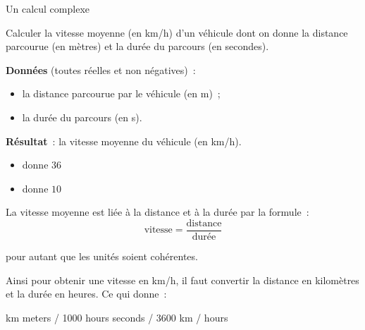\begin{Fiche}{Un calcul complexe}
\label{fiche:calcul-complexe}


	Calculer la vitesse moyenne (en km/h) d’un véhicule dont on donne la
	distance parcourue (en mètres) et la durée du parcours (en secondes). 

	
	\textbf{Données} (toutes réelles et non négatives)~:
		\begin{itemize}
		\item la distance parcourue par le véhicule (en m)~;
		\item la durée du parcours (en s).
		\end{itemize}
		
	\textbf{Résultat}~: la vitesse moyenne du véhicule (en km/h).

	\begin{center}
	\end{center}


	\begin{itemize}
	\item {} donne $36$
	\item {} donne $10$
	\end{itemize}


	La vitesse moyenne est liée à la distance et à la durée par la formule~:
	\[
		\textrm{vitesse} = \frac{\textrm{distance}}{\textrm{durée}}
	\]

	\begin{flushright}
	pour autant que les unités soient cohérentes.
	\end{flushright}

	Ainsi pour obtenir une vitesse en km/h, il faut convertir la distance en
	kilomètres et la durée en heures.  Ce qui donne~:
		
	\begin{pseudocode}
			\Let km \Gets meters / 1000
			\Let hours \Gets seconds / 3600
			\Return km / hours
		\EndAlgo
	\end{pseudocode}



\end{Fiche}
